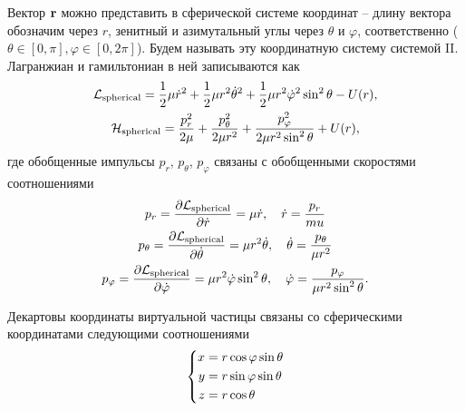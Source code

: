 Вектор $\mathbf{r}$ можно представить в сферической системе координат -- длину вектора обозначим через $r$, зенитный и азимутальный углы через $\theta$ и $\varphi$, соответственно ($\theta \in [0, \pi], \varphi \in [0, 2 \pi]$). Будем называть эту координатную систему системой II. Лагранжиан и гамильтониан в ней записываются как
\begin{gather}
    \mathcal{L}_\text{spherical} = \frac{1}{2} \mu \dot{r}^2 + \frac{1}{2} \mu r^2 \dot{\theta}^2 + \frac{1}{2} \mu r^2 \dot{\varphi}^2 \sin^2 \theta - U(r),  \label{two-atom-spherical-lagrangian} \\
    \mathcal{H}_\text{spherical} = \frac{p_r^2}{2 \mu} + \frac{p_\theta^2}{2 \mu r^2} + \frac{p_\varphi^2}{2 \mu r^2 \sin^2 \theta} + U(r), \label{two-atom-spherical-hamiltonian}
\end{gather}
%
где обобщенные импульсы $p_r$, $p_\theta$, $p_\varphi$ связаны с обобщенными скоростями соотношениями
\begin{gather}
    p_r = \frac{\partial \mathcal{L}_\text{spherical}}{\partial \dot{r}} = \mu \dot{r}, \quad \dot{r} = \frac{p_r}{mu} \label{two-atom-spherical-momenta1} \\
    p_\theta = \frac{\partial \mathcal{L}_\text{spherical}}{\partial \dot{\theta}} = \mu r^2 \dot{\theta}, \quad \dot{\theta} = \frac{p_\theta}{\mu r^2} \label{two-atom-spherical-momenta2} \\
    p_\varphi = \frac{\partial \mathcal{L}_\text{spherical}}{\partial \dot{\varphi}} = \mu r^2 \dot{\varphi} \sin^2 \theta, \quad \dot{\varphi} = \frac{p_\varphi}{\mu r^2 \sin^2 \theta} \label{two-atom-spherical-momenta3}.
\end{gather}

Декартовы координаты виртуальной частицы связаны со сферическими координатами следующими соотношениями
\begin{gather}
    \left\{
    \begin{aligned}
        x &= r \cos \varphi \sin \theta \\
        y &= r \sin \varphi \sin \theta \\
        z &= r \cos \theta
    \end{aligned}
    \right. \label{two-atom-spherical-coordinates}
\end{gather}

